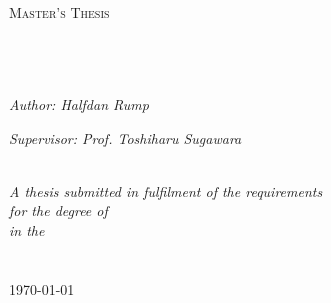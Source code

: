 \documentclass[11pt, a4paper, oneside]{Thesis} %
\begin{document}
\newcommand{\round}{r}
\newcommand{\delay}{\ensuremath{p^m}}
\newcommand*{\spread}[1][]{\ensuremath{s_{\round #1}}}
\newcommand*{\pask}[1][]{\ensuremath{p^a_{\round #1}}}
\newcommand*{\pbid}[1][]{\ensuremath{p^b_{\round #1}}}
\newcommand{\pmatch}{\ensuremath{p^m}}
\newcommand*{\fund}[1][]{\ensuremath{f_{\round #1}}}

\newcommand{\smargin}{\ensuremath{m_\text{stable}}}
\newcommand{\fas}{\ensuremath{p_\text{fas}}}

\newcommand{\ask}{ask}
\newcommand{\bid}{bid}

\hypersetup{pdfsubject=\subjectname}
\hypersetup{pdfauthor=\authornames}
\hypersetup{pdfkeywords=\keywordnames}


\begin{titlepage}
\begin{center}

\textsc{\LARGE \univname}\\[1.5cm] %
\textsc{\Large Master's Thesis}\\[0.5cm] %

\HRule \\[0.4cm] %
{\huge \bfseries \ttitle}\\[0.4cm] %
\HRule \\[1.5cm] %
 
\begin{minipage}{0.4\textwidth}
\begin{flushleft} \large
\emph{Author: Halfdan Rump}\\
\end{flushleft}
\end{minipage}
\begin{minipage}{0.4\textwidth}
\begin{flushright} \large
\emph{Supervisor: Prof. Toshiharu Sugawara} \\
\end{flushright}
\end{minipage}\\[3cm]
 
\large \textit{A thesis submitted in fulfilment of the requirements\\ for the degree of \degreename}\\[0.3cm] %
\textit{in the}\\[0.4cm]
\groupname\\\deptname\\[2cm] %
 
{\large \today}\\[4cm] %
 
\vfill
\end{center}

\end{titlepage}
\end{document}
